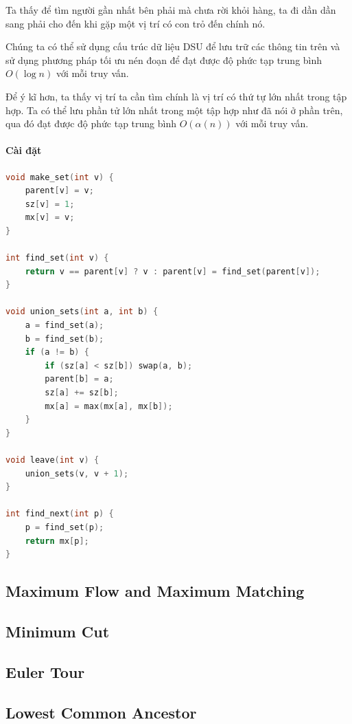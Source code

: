 \documentclass{article}
\begin{document}
Ta thấy để tìm người gần nhất bên phải mà chưa rời khỏi hàng, ta đi dần dần sang phải cho đến khi gặp một vị trí có con trỏ đến chính nó.

Chúng ta có thể sử dụng cấu trúc dữ liệu DSU để lưu trữ các thông tin trên và sử dụng phương pháp tối ưu nén đoạn để đạt được độ phức tạp trung bình \(O(\log n)\) với mỗi truy vấn.

Để ý kĩ hơn, ta thấy vị trí ta cần tìm chính là vị trí có thứ tự lớn nhất trong tập hợp. Ta có thể lưu phần tử lớn nhất trong một tập hợp như đã nói ở phần trên, qua đó đạt được độ phức tạp trung bình \(O(\alpha(n))\) với mỗi truy vấn.

\paragraph{Cài đặt}
\begin{lstlisting}[language=C++]
void make_set(int v) {
    parent[v] = v;
    sz[v] = 1;
    mx[v] = v;
}

int find_set(int v) {
    return v == parent[v] ? v : parent[v] = find_set(parent[v]);
}

void union_sets(int a, int b) {
    a = find_set(a);
    b = find_set(b);
    if (a != b) {
        if (sz[a] < sz[b]) swap(a, b);
        parent[b] = a;
        sz[a] += sz[b];
        mx[a] = max(mx[a], mx[b]);
    }
}

void leave(int v) { 
    union_sets(v, v + 1);
}

int find_next(int p) { 
    p = find_set(p);
    return mx[p];
}
\end{lstlisting}

\subsection{Maximum Flow and Maximum Matching}

\subsection{Minimum Cut}
\subsection{Euler Tour}
\subsection{Lowest Common Ancestor}
\end{document}
